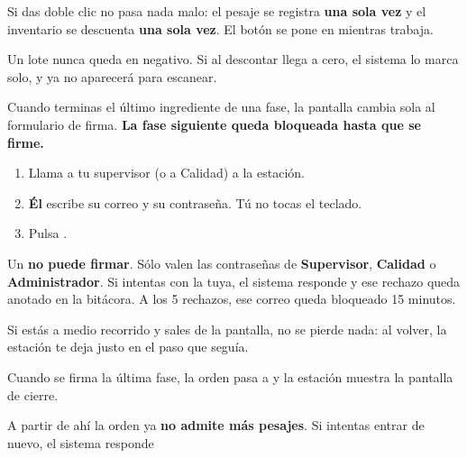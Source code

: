 \begin{cajaTip}
Si das doble clic no pasa nada malo: el pesaje se registra \textbf{una sola vez} y
el inventario se descuenta \textbf{una sola vez}. El botón se pone en
 mientras trabaja.
\end{cajaTip}

Un lote nunca queda en negativo. Si al descontar llega a cero, el sistema lo marca
\agotado{} solo, y ya no aparecerá para escanear.


Cuando terminas el último ingrediente de una fase, la pantalla cambia sola al
formulario de firma. \textbf{La fase siguiente queda bloqueada hasta que se firme.}


\begin{enumerate}
    \item Llama a tu supervisor (o a Calidad) a la estación.
    \item \textbf{Él} escribe su correo y su contraseña. Tú no tocas el teclado.
    \item Pulsa .
\end{enumerate}

\begin{cajaOjo}
Un \manualRol{} \textbf{no puede firmar}. Sólo valen las contraseñas de
\textbf{Supervisor}, \textbf{Calidad} o \textbf{Administrador}. Si intentas con la tuya,
el sistema responde  y ese rechazo queda anotado en la bitácora.
A los 5 rechazos, ese correo queda bloqueado 15 minutos.
\end{cajaOjo}

Si estás a medio recorrido y sales de la pantalla, no se pierde nada: al volver, la
estación te deja justo en el paso que seguía.

\newpage
{}

Cuando se firma la última fase, la orden pasa a \dispensado{} y la estación muestra
la pantalla de cierre.


\vspace{6pt}

A partir de ahí la orden ya \textbf{no admite más pesajes}. Si intentas entrar de
nuevo, el sistema responde 

